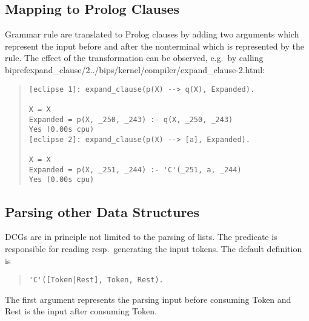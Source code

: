 \subsection{Mapping to Prolog Clauses}
Grammar rule are translated to Prolog clauses by adding two arguments
which represent the input before and after the nonterminal which is
represented by the rule.
The effect of the transformation can be observed, e.g.\ by calling bipref{expand_clause/2}{../bips/kernel/compiler/expand_clause-2.html}:
\begin{quote} \begin{verbatim}
[eclipse 1]: expand_clause(p(X) --> q(X), Expanded).

X = X
Expanded = p(X, _250, _243) :- q(X, _250, _243)
Yes (0.00s cpu)
[eclipse 2]: expand_clause(p(X) --> [a], Expanded).

X = X
Expanded = p(X, _251, _244) :- 'C'(_251, a, _244)
Yes (0.00s cpu)
\end{verbatim} \end{quote}

\subsection{Parsing other Data Structures}

DCGs are in principle not limited to the parsing of lists.
The predicate  is responsible for reading resp.\ generating
the input tokens. The default definition is
\begin{quote}\begin{verbatim}
'C'([Token|Rest], Token, Rest).
\end{verbatim}\end{quote}
The first argument represents the parsing input before consuming
Token and Rest is the input after consuming Token.


